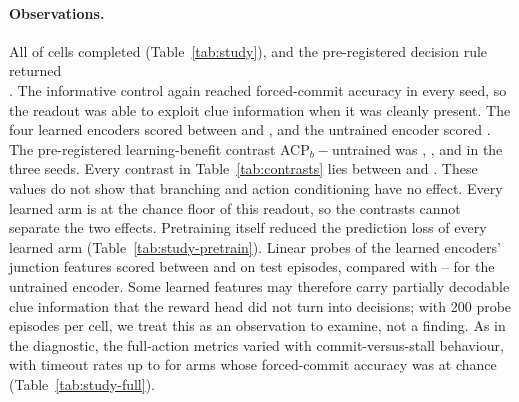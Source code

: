 \paragraph{Observations.}
All \StudyNumOK{} of \StudyNumCells{} cells completed (Table~\ref{tab:study}), and the pre-registered decision rule returned\\ \StudyVerdict{}. The informative control again reached forced-commit accuracy \StudyForcedInfoMin{} in every seed, so the readout was able to exploit clue information when it was cleanly present. The four learned encoders scored between \StudyForcedLearnedMin{} and \StudyForcedLearnedMax{}, and the untrained encoder scored \StudyForcedRandMax{}. The pre-registered learning-benefit contrast ACP$_b-$untrained was \StudyLearnRandSeedI, \StudyLearnRandSeedII, and \StudyLearnRandSeedIII{} in the three seeds. Every contrast in Table~\ref{tab:contrasts} lies between \StudyAllContrastMin{} and \StudyAllContrastMax. These values do not show that branching and action conditioning have no effect. Every learned arm is at the chance floor of this readout, so the contrasts cannot separate the two effects. Pretraining itself reduced the prediction loss of every learned arm (Table~\ref{tab:study-pretrain}). Linear probes of the learned encoders' junction features scored between \StudyProbeLearnedMin{} and \StudyProbeLearnedMax{} on test episodes, compared with \StudyProbeRandMin--\StudyProbeRandMax{} for the untrained encoder. Some learned features may therefore carry partially decodable clue information that the reward head did not turn into decisions; with 200 probe episodes per cell, we treat this as an observation to examine, not a finding. As in the diagnostic, the full-action metrics varied with commit-versus-stall behaviour, with timeout rates up to \StudyTimeoutNonInfoMax{} for arms whose forced-commit accuracy was at chance (Table~\ref{tab:study-full}).

\begin{table}[t]
\caption{2$\times$2 study, per seed (\StudySeeds). The primary metric is forced-commit accuracy, a junction decision rather than a planning success rate. The probe is a logistic probe fitted on the calibration split and scored on test junction features. ``Head epochs'' is the checkpoint selected on development reward error; the grid was not extended when 80 was selected. Source: \texttt{runs/study2x2\_20260926T225310Z\_fd781be}.}
\label{tab:study}
\centering
\small

\end{table}

